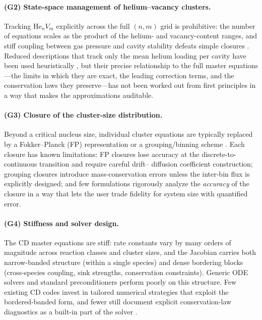 \documentclass[sn-mathphys-ay,Numbered]{sn-jnl}
\begin{document}
\paragraph{(G2) State-space management of helium--vacancy clusters.}
Tracking $\mathrm{He}_{n}V_{m}$ explicitly across the full
$(n,m)$ grid is prohibitive: the number of equations scales as the
product of the helium- and vacancy-content ranges, and stiff coupling
between gas pressure and cavity stability defeats simple closures
\citep{Trinkaus2003,Schaublin2007,Caturla2008}. Reduced descriptions
that track only the mean helium loading per cavity have been used
heuristically \citep{Ghoniem1989,Stewart2010}, but their precise
relationship to the full master equations---the limits in which they
are exact, the leading correction terms, and the conservation laws
they preserve---has not been worked out from first principles in a
way that makes the approximations auditable.

\paragraph{(G3) Closure of the cluster-size distribution.}
Beyond a critical nucleus size, individual cluster equations are
typically replaced by a Fokker--Planck (FP) representation
\citep{Wagner1981,Ghoniem1989,Russell1984} or a grouping/binning
scheme \citep{GolubovSingh2001,Ovcharenko2003,KohnertWirth2017,Cui2020}.
Each closure has known limitations: FP closures lose accuracy at
the discrete-to-continuous transition and require careful drift--
diffusion coefficient construction; grouping closures introduce
mass-conservation errors unless the inter-bin flux is explicitly
designed; and few formulations rigorously analyze the
\emph{accuracy} of the closure in a way that lets the user trade
fidelity for system size with quantified error.

\paragraph{(G4) Stiffness and solver design.}
The CD master equations are stiff: rate constants vary by many orders
of magnitude across reaction classes and cluster sizes, and the
Jacobian carries both narrow-banded structure (within a single
species) and dense bordering blocks (cross-species coupling, sink
strengths, conservation constraints). Generic ODE solvers and standard
preconditioners perform poorly on this structure. Few existing CD
codes invest in tailored numerical strategies that exploit the
bordered-banded form, and fewer still document explicit
conservation-law diagnostics as a built-in part of the solver
\citep{Saad2003,Stoller2008}.
\end{document}
